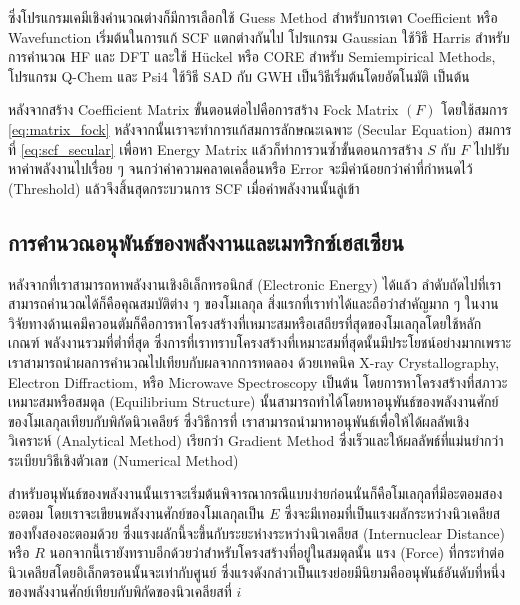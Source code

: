 ซึ่งโปรแกรมเคมีเชิงคำนวณต่างก็มีการเลือกใช้ Guess Method สำหรับการเดา Coefficient หรือ Wavefunction เริ่มต้นในการแก้ SCF แตกต่างกันไป
โปรแกรม Gaussian ใช้วิธี Harris สำหรับการคำนวณ HF และ DFT และใช้ H{\"u}ckel หรือ CORE สำหรับ Semiempirical Methods,
โปรแกรม Q-Chem และ Psi4 ใช้วิธี SAD กับ GWH เป็นวิธีเริ่มต้นโดยอัตโนมัติ เป็นต้น

หลังจากสร้าง Coefficient Matrix ขั้นตอนต่อไปคือการสร้าง Fock Matrix $(F)$ โดยใช้สมการ \eqref{eq:matrix_fock}
หลังจากนั้นเราจะทำการแก้สมการลักษณะเฉพาะ (Secular Equation) สมการที่ \eqref{eq:scf_secular} เพื่อหา Energy Matrix
แล้วก็ทำการวนซ้ำขั้นตอนการสร้าง $S$ กับ $F$ ไปปรับหาค่าพลังงานไปเรื่อย ๆ จนกว่าค่าความคลาดเคลื่อนหรือ Error จะมีค่าน้อยกว่าค่าที่กำหนดไว้
(Threshold) แล้วจึงสิ้นสุดกระบวนการ SCF เมื่อค่าพลังงานนั้นลู่เข้า

\subsection{การคำนวณอนุพันธ์ของพลังงานและเมทริกซ์เฮสเซียน}
\label{ssec:ener_der}

หลังจากที่เราสามารถหาพลังงานเชิงอิเล็กทรอนิกส์ (Electronic Energy) ได้แล้ว ลำดับถัดไปที่เราสามารถคำนวณได้ก็คือคุณสมบัติต่าง ๆ ของโมเลกุล
สิ่งแรกที่เราทำได้และถือว่าสำคัญมาก ๆ ในงานวิจัยทางด้านเคมีควอนตัมก็คือการหาโครงสร้างที่เหมาะสมหรือเสถียรที่สุดของโมเลกุลโดยใช้หลักเกณฑ์%
พลังงานรวมที่ต่ำที่สุด ซึ่งการที่เราทราบโครงสร้างที่เหมาะสมที่สุดนั้นมีประโยชน์อย่างมากเพราะเราสามารถนำผลการคำนวณไปเทียบกับผลจากการทดลอง%
ด้วยเทคนิค X-ray Crystallography, Electron Diffractiom, หรือ Microwave Spectroscopy เป็นต้น โดยการหาโครงสร้างที่สภาวะ%
เหมาะสมหรือสมดุล (Equilibrium Structure) นั้นสามารถทำได้โดยหาอนุพันธ์ของพลังงานศักย์ของโมเลกุลเทียบกับพิกัดนิวเคลียร์ ซึ่งวิธีการที่%
เราสามารถนำมาหาอนุพันธ์เพื่อให้ได้ผลลัพเชิงวิเคราะห์ (Analytical Method) เรียกว่า Gradient Method ซึ่งเร็วและให้ผลลัพธ์ที่แม่นยำกว่า%
ระเบียบวิธีเชิงตัวเลข (Numerical Method)

สำหรับอนุพันธ์ของพลังงานนั้นเราจะเริ่มต้นพิจารณากรณีแบบง่ายก่อนนั่นก็คือโมเลกุลที่มีอะตอมสองอะตอม โดยเราจะเขียนพลังงานศักย์ของโมเลกุลเป็น
$E$ ซึ่งจะมีเทอมที่เป็นแรงผลักระหว่างนิวเคลียสของทั้งสองอะตอมด้วย ซึ่งแรงผลักนี้จะขึ้นกับระยะห่างระหว่างนิวเคลียส (Internuclear Distance)
หรือ $R$ นอกจากนี้เรายังทราบอีกด้วยว่าสำหรับโครงสร้างที่อยู่ในสมดุลนั้น แรง (Force) ที่กระทำต่อนิวเคลียสโดยอิเล็กตรอนนั้นจะเท่ากับศูนย์
ซึ่งแรงดังกล่าวเป็นแรงย่อยมีนิยามคืออนุพันธ์อันดับที่หนึ่งของพลังงานศักย์เทียบกับพิกัดของนิวเคลียสที่ $i$

